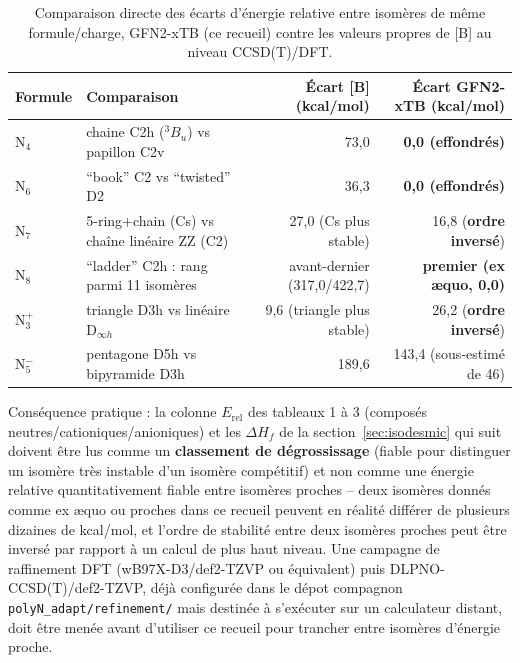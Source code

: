 \documentclass[11pt,a4paper]{article}
\begin{document}
\begin{table}[H]
\centering
\small
\begin{tabular}{@{}p{1.3cm}p{5.4cm}rr@{}}
\toprule
Formule & Comparaison & \'Ecart [B] (kcal/mol) & \'Ecart GFN2-xTB (kcal/mol) \\
\midrule
N$_4$ & chaine C2h ($^3B_u$) vs papillon C2v & 73{,}0 & \textbf{0{,}0 (effondr\'es)} \\
N$_6$ & ``book'' C2 vs ``twisted'' D2 & 36{,}3 & \textbf{0{,}0 (effondr\'es)} \\
N$_7$ & 5-ring+chain (Cs) vs cha\^ine lin\'eaire ZZ (C2) & 27{,}0 (Cs plus stable) & 16{,}8 (\textbf{ordre invers\'e}) \\
N$_8$ & ``ladder'' C2h : rang parmi 11 isom\`eres & avant-dernier (317{,}0/422{,}7) & \textbf{premier (ex \ae quo, 0{,}0)} \\
N$_3^{+}$ & triangle D3h vs lin\'eaire D$_{\infty h}$ & 9{,}6 (triangle plus stable) & 26{,}2 (\textbf{ordre invers\'e}) \\
N$_5^{-}$ & pentagone D5h vs bipyramide D3h & 189{,}6 & 143{,}4 (sous-estim\'e de 46) \\
\bottomrule
\end{tabular}
\caption{Comparaison directe des \'ecarts d'\'energie relative entre
isom\`eres de m\^eme formule/charge, GFN2-xTB (ce recueil) contre les
valeurs propres de [B] au niveau CCSD(T)/DFT.}
\label{tab:gfn2-vs-bartlett}
\end{table}

Cons\'equence pratique : la colonne $E_{\mathrm{rel}}$ des tableaux 1 \`a
3 (compos\'es neutres/cationiques/anioniques) et les $\Delta H_f$ de la
section~\ref{sec:isodesmic} qui suit doivent \^etre lus comme un
\textbf{classement de d\'egrossissage} (fiable pour distinguer un
isom\`ere tr\`es instable d'un isom\`ere comp\'etitif) et non comme une
\'energie relative quantitativement fiable entre isom\`eres proches --
deux isom\`eres donn\'es comme ex \ae quo ou proches dans ce recueil
peuvent en r\'ealit\'e diff\'erer de plusieurs dizaines de kcal/mol, et
l'ordre de stabilit\'e entre deux isom\`eres proches peut \^etre invers\'e
par rapport \`a un calcul de plus haut niveau. Une campagne de
raffinement DFT (wB97X-D3/def2-TZVP ou \'equivalent) puis
DLPNO-CCSD(T)/def2-TZVP, d\'ej\`a configur\'ee dans le d\'epot compagnon
\texttt{polyN\_adapt/refinement/} mais destin\'ee \`a s'ex\'ecuter sur un
calculateur distant, doit \^etre men\'ee avant d'utiliser ce recueil pour
trancher entre isom\`eres d'\'energie proche.
\end{document}
